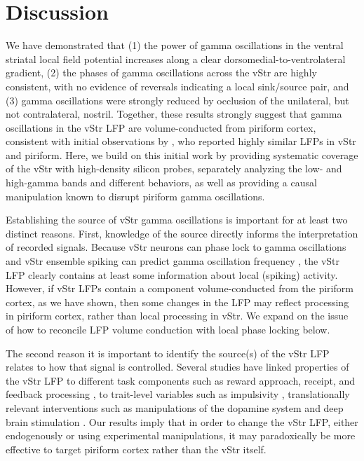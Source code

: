 \documentclass[11pt]{article}
\let\cite=\citep
\let\citeN=\citet
\begin{document}
\section*{Discussion}

We have demonstrated that (1) the power of gamma oscillations in the
ventral striatal local field potential increases along a clear
dorsomedial-to-ventrolateral gradient, (2) the phases of gamma
oscillations across the vStr are highly consistent, with no evidence
of reversals indicating a local sink/source pair, and (3) gamma
oscillations were strongly reduced by occlusion of the unilateral, but
not contralateral, nostril. Together, these results strongly suggest
that gamma oscillations in the vStr LFP are volume-conducted from
piriform cortex, consistent with initial observations by
\citeN{Berke2009b}, who reported highly similar LFPs in vStr and
piriform. Here, we build on this initial work by providing systematic
coverage of the vStr with high-density silicon probes, separately
analyzing the low- and high-gamma bands and different behaviors, as
well as providing a causal manipulation known to disrupt piriform
gamma oscillations.

Establishing the source of vStr gamma oscillations is important for at
least two distinct reasons. First, knowledge of the source directly
informs the interpretation of recorded signals. Because vStr neurons
can phase lock to gamma oscillations \cite{Berke2009b, Kalenscher2010,
  VanderMeer2010b,Howe2011, Dejean2016} and vStr ensemble spiking can
predict gamma oscillation frequency \cite{Catanese2016}, the vStr LFP
clearly contains at least some information about local (spiking)
activity. However, if vStr LFPs contain a component volume-conducted
from the piriform cortex, as we have shown, then some changes in the
LFP may reflect processing in piriform cortex, rather than local
processing in vStr. We expand on the issue of how to reconcile LFP
volume conduction with local phase locking below.

The second reason it is important to identify the source(s) of the
vStr LFP relates to how that signal is controlled. Several studies
have linked properties of the vStr LFP to different task components
such as reward approach, receipt, and feedback processing
\cite{Vandermeer2009a,Cohen2009d}, to trait-level variables such as
impulsivity \cite{Donnelly2014}, translationally relevant
interventions such as manipulations of the dopamine system
\cite{Berke2009b,Lemaire2012,Morra2012} and deep brain stimulation
\cite{McCracken2009,Doucette2015}. Our results imply that in order to
change the vStr LFP, either endogenously or using experimental
manipulations, it may paradoxically be more effective to target
piriform cortex rather than the vStr itself.
\end{document}
